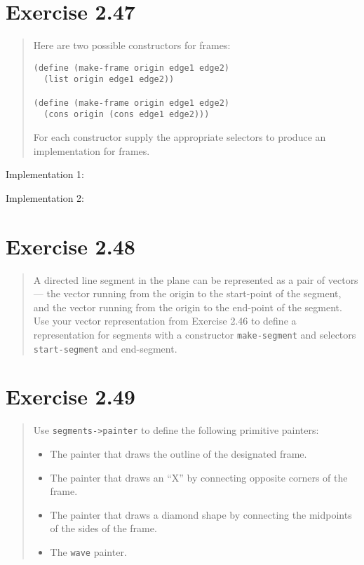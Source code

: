 \documentclass{article}
\begin{document}


\section{Exercise 2.47}
\begin{quote}
    Here are two possible constructors for frames:
    \begin{lstlisting}
(define (make-frame origin edge1 edge2)
  (list origin edge1 edge2))

(define (make-frame origin edge1 edge2)
  (cons origin (cons edge1 edge2)))
    \end{lstlisting}
    For each constructor supply the appropriate selectors to produce an
    implementation for frames.
\end{quote}

Implementation 1:


Implementation 2:


\section{Exercise 2.48}
\begin{quote}
    A directed line segment in the plane can be represented as a pair of
    vectors --- the vector running from the origin to the start-point of the
    segment, and the vector running from the origin to the end-point of the
    segment. Use your vector representation from Exercise 2.46 to define a
    representation for segments with a constructor \texttt{make-segment} and
    selectors \texttt{start-segment} and end-segment.
\end{quote}



\section{Exercise 2.49}
\begin{quote}
    Use \texttt{segments->painter} to define the following primitive painters:
    \begin{itemize}
        \item The painter that draws the outline of the designated frame.
        \item The painter that draws an “X” by connecting opposite corners of
            the frame.
        \item The painter that draws a diamond shape by connecting
            the midpoints of the sides of the frame.
        \item The \texttt{wave} painter.
    \end{itemize}
\end{quote}
\end{document}
